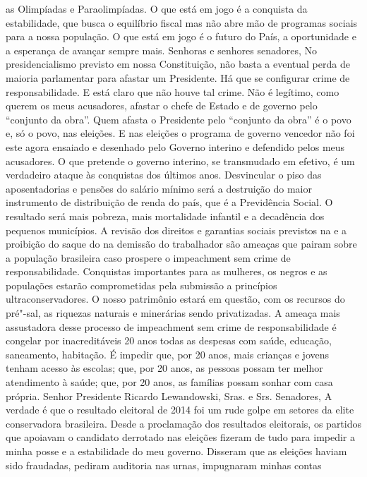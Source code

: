 as Olimpíadas e Paraolimpíadas. O que está em jogo é a conquista da
estabilidade, que busca o equilíbrio fiscal mas não abre mão de
programas sociais para a nossa população. O que está em jogo é o futuro
do País, a oportunidade e a esperança de avançar sempre mais. Senhoras e
senhores senadores, No presidencialismo previsto em nossa Constituição,
não basta a eventual perda de maioria parlamentar para afastar um
Presidente. Há que se configurar crime de responsabilidade. E está claro
que não houve tal crime. Não é legítimo, como querem os meus acusadores,
afastar o chefe de Estado e de governo pelo ``conjunto da obra''. Quem
afasta o Presidente pelo ``conjunto da obra'' é o povo e, só o povo, nas
eleições. E nas eleições o programa de governo vencedor não foi este
agora ensaiado e desenhado pelo Governo interino e defendido pelos meus
acusadores. O que pretende o governo interino, se transmudado em
efetivo, é um verdadeiro ataque às conquistas dos últimos anos.
Desvincular o piso das aposentadorias e pensões do salário mínimo será a
destruição do maior instrumento de distribuição de renda do país, que é
a Previdência Social. O resultado será mais pobreza, mais mortalidade
infantil e a decadência dos pequenos municípios. A revisão dos direitos
e garantias sociais previstos na  e a proibição do saque do  na
demissão do trabalhador são ameaças que pairam sobre a população
brasileira caso prospere o impeachment sem crime de responsabilidade.
Conquistas importantes para as mulheres, os negros e as populações 
estarão comprometidas pela submissão a princípios ultraconservadores. O
nosso patrimônio estará em questão, com os recursos do pré"-sal, as
riquezas naturais e minerárias sendo privatizadas. A ameaça mais
assustadora desse processo de impeachment sem crime de responsabilidade
é congelar por inacreditáveis 20 anos todas as despesas com saúde,
educação, saneamento, habitação. É impedir que, por 20 anos, mais
crianças e jovens tenham acesso às escolas; que, por 20 anos, as pessoas
possam ter melhor atendimento à saúde; que, por 20 anos, as famílias
possam sonhar com casa própria. Senhor Presidente Ricardo Lewandowski,
Sras. e Srs. Senadores, A verdade é que o resultado eleitoral de 2014
foi um rude golpe em setores da elite conservadora brasileira. Desde a
proclamação dos resultados eleitorais, os partidos que apoiavam o
candidato derrotado nas eleições fizeram de tudo para impedir a minha
posse e a estabilidade do meu governo. Disseram que as eleições haviam
sido fraudadas, pediram auditoria nas urnas, impugnaram minhas contas
